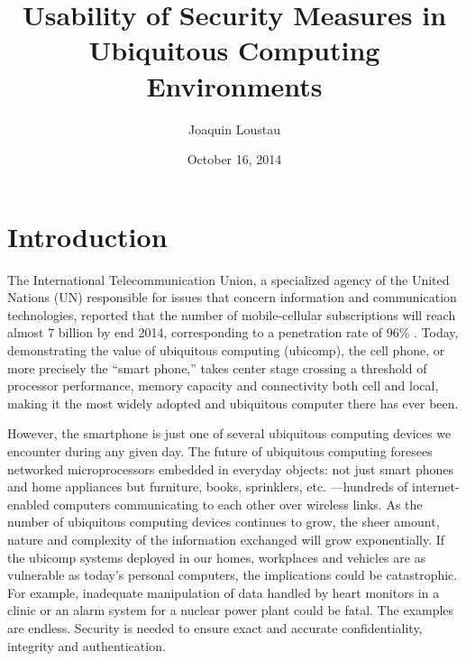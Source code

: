 \documentclass{article}
\title{Usability of Security Measures in Ubiquitous Computing Environments}
\author{Joaquin Loustau}
\date{October 16, 2014}
\begin{document}
\maketitle


\pagebreak
\tableofcontents

\pagebreak

%
%
\section{Introduction}
\label{introduction}
The International Telecommunication Union, a specialized agency of the United Nations (UN) responsible for issues that concern information and communication technologies, reported that the number of mobile-cellular subscriptions will reach almost 7 billion by end 2014, corresponding to a penetration rate of 96\% \cite{itu2014world}. Today, demonstrating the value of ubiquitous computing (ubicomp), the cell phone, or more precisely the “smart phone,” takes center stage crossing a threshold of processor performance, memory capacity and connectivity both cell and local, making it the most widely adopted and ubiquitous computer there has ever been. 

However, the smartphone is just one of several ubiquitous computing devices we encounter during any given day. The future of ubiquitous computing foresees networked microprocessors embedded in everyday objects: not just smart phones and home appliances but furniture, books, sprinklers, etc. ---hundreds of internet-enabled computers communicating to each other over wireless links. 
As the number of ubiquitous computing devices continues to grow, the sheer amount, nature and complexity of the information exchanged will grow exponentially. If the ubicomp systems deployed in our homes, workplaces and vehicles are as vulnerable as today’s personal computers, the implications could be catastrophic. For example, inadequate manipulation of data handled by heart monitors in a clinic or an alarm system for a nuclear power plant could be fatal. The examples are endless. Security is needed to ensure exact and accurate confidentiality, integrity and authentication.
\end{document}
